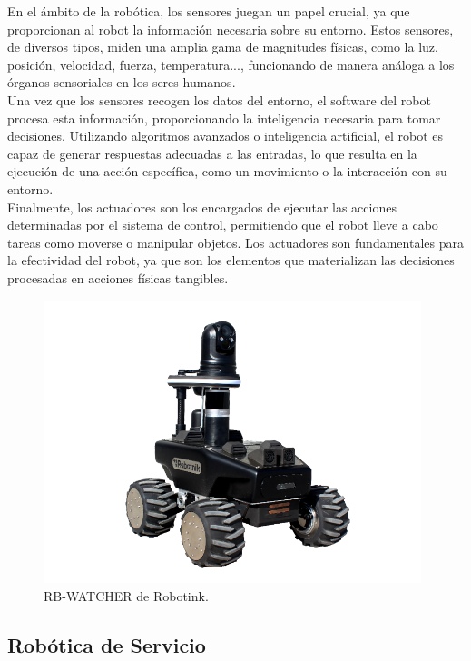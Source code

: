 En el ámbito de la robótica, los sensores juegan un papel crucial, ya que proporcionan al robot la información necesaria sobre su entorno. Estos sensores, de diversos tipos, miden una amplia gama de magnitudes físicas, como la luz, posición, velocidad, fuerza, temperatura..., funcionando de manera análoga a los órganos sensoriales en los seres humanos. \\

Una vez que los sensores recogen los datos del entorno, el software del robot procesa esta información, proporcionando la inteligencia necesaria para tomar decisiones. Utilizando algoritmos avanzados o inteligencia artificial, el robot es capaz de generar respuestas adecuadas a las entradas, lo que resulta en la ejecución de una acción específica, como un movimiento o la interacción con su entorno. \\

Finalmente, los actuadores son los encargados de ejecutar las acciones determinadas por el sistema de control, permitiendo que el robot lleve a cabo tareas como moverse o manipular objetos. Los actuadores son fundamentales para la efectividad del robot, ya que son los elementos que materializan las decisiones procesadas en acciones físicas tangibles. 

\begin{figure} [h!]
  \begin{center}
    \includegraphics[width=11cm]{figs/Robot_intro}
  \end{center}
  \caption{\centering RB-WATCHER de Robotink.}
  \label{fig:Robot_intro}
\end{figure}

\subsection{Robótica de Servicio}
\label{sec:subseccion_1}

